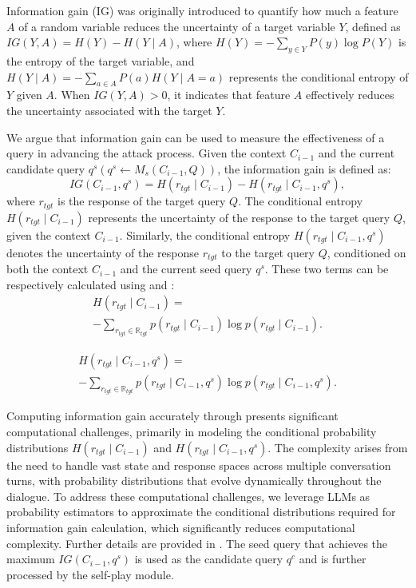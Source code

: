 Information gain (IG) \cite{ig2,ig1} was originally introduced to quantify how much a feature $A$ of a random variable reduces the uncertainty of a target variable $Y$, defined as $IG(Y,A) = H(Y) - H(Y \mid A)$, where $H(Y)= - \sum\limits_{y \in Y} P(y)\log P(Y)$ is the entropy \cite{ee} of the target variable, and $H(Y \mid A)=- \sum\limits_{a \in A} P(a)H(Y \mid A=a)$ represents the conditional entropy of $Y$ given $A$. When $IG(Y,A) > 0$, it indicates that feature $A$ effectively reduces the uncertainty associated with the target $Y$. 

We argue that information gain can be used to measure the effectiveness of a query in advancing the attack process. Given the context $C_{i-1}$ and the current candidate query $q^s (q^s \gets M_{s}(C_{i-1},Q))$, the information gain is defined as:
\begin{equation}\label{e:ig1}
    IG(C_{i-1},q^s) = H(r_{tgt} \mid C_{i-1}) - H(r_{tgt} \mid C_{i-1},q^s),
\end{equation}
where $r_{tgt}$ is the response of the target query $Q$. The conditional entropy $H(r_{tgt} \mid C_{i-1})$ represents the uncertainty of the response to the target query $Q$, given the context $C_{i-1}$. Similarly, the conditional entropy $H(r_{tgt} \mid C_{i-1},q^s)$ denotes the uncertainty of the response $r_{tgt}$ to the target query $Q$, conditioned on both the context $C_{i-1}$ and the current seed query $q^s$. These two terms can be respectively calculated using  and :
\begin{multline}\label{e:ig2}
    H(r_{tgt} \mid C_{i-1}) = \\
    -\sum\limits_{r_{tgt} \in \mathbb{R}_{tgt}} 
    p(r_{tgt} \mid C_{i-1})\log p(r_{tgt} \mid C_{i-1}).
\end{multline}

\begin{multline}\label{e:ig3}
    H(r_{tgt} \mid C_{i-1},q^s) = \\
    -\sum\limits_{r_{tgt} \in \mathbb{R}_{tgt}}p(r_{tgt} \mid C_{i-1},q^s)\log p(r_{tgt} \mid C_{i-1},q^s).
\end{multline}

Computing information gain accurately through  presents significant computational challenges, primarily in modeling the conditional probability distributions $H(r_{tgt} \mid C_{i-1})$ and $H(r_{tgt} \mid C_{i-1},q^s)$. The complexity arises from the need to handle vast state and response spaces across multiple conversation turns, with probability distributions that evolve dynamically throughout the dialogue. To address these computational challenges, we leverage LLMs as probability estimators to approximate the conditional distributions required for information gain calculation, which significantly reduces computational complexity. Further details are provided in . The seed query that achieves the maximum $IG(C_{i-1}, q^s)$ is used as the candidate query $q^c$ and is further processed by the self-play module.

